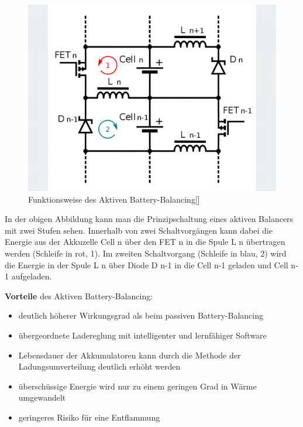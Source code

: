 \begin{figure}[H]
	\begin{center}
		\includegraphics[scale=0.4]{figures/Akku/Aktives Balancing.png}
		\caption{Funktionsweise des Aktiven Battery-Balancing[\cite{FunktionsweiseAktivBalancing}]}
		\label{fig: Funktionsweise des Aktiven Battery-Balancing}
	\end{center}
\end{figure}

In der obigen Abbildung kann man die Prinzipschaltung eines aktiven Balancers mit zwei Stufen sehen. Innerhalb von zwei Schaltvorgängen kann dabei die Energie aus der Akkuzelle Cell n über den FET n in die Spule L n übertragen werden (Schleife in rot, 1).
Im zweiten Schaltvorgang (Schleife in blau, 2) wird die Energie in der Spule L n über Diode D n-1 in die Cell n-1 geladen und Cell n-1 aufgeladen.

\textbf{Vorteile} des Aktiven Battery-Balancing:
\begin{itemize}
\item {deutlich höherer Wirkungsgrad als beim passiven Battery-Balancing} \medskip\\
\item {übergeordnete Ladereglung mit intelligenter und lernfähiger Software} \medskip\\
\item {Lebensdauer der Akkumulatoren kann durch die Methode der Ladungsumverteilung deutlich erhöht werden} \medskip\\
\item {überschüssige Energie wird nur zu einem geringen Grad in Wärme umgewandelt} \medskip\\
\item {geringeres Risiko für eine Entflammung} \medskip\\
\end{itemize}

